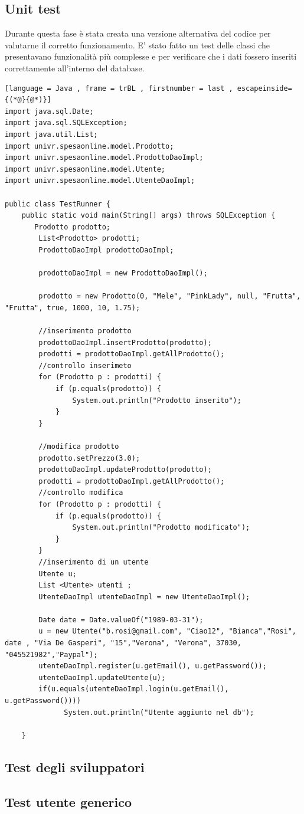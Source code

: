 \documentclass{article}
\begin{document}
\newpage

\subsection{Unit test}
Durante questa fase è stata creata una versione alternativa del codice per valutarne il corretto funzionamento. E' stato fatto un test delle classi che presentavano funzionalità più complesse  e per verificare che i dati fossero inseriti correttamente all'interno del database.

\begin{lstlisting}[language = Java , frame = trBL , firstnumber = last , escapeinside={(*@}{@*)}]
import java.sql.Date;
import java.sql.SQLException;
import java.util.List;
import univr.spesaonline.model.Prodotto;
import univr.spesaonline.model.ProdottoDaoImpl;
import univr.spesaonline.model.Utente;
import univr.spesaonline.model.UtenteDaoImpl;

public class TestRunner {
    public static void main(String[] args) throws SQLException {
       Prodotto prodotto;
        List<Prodotto> prodotti;
        ProdottoDaoImpl prodottoDaoImpl;

        prodottoDaoImpl = new ProdottoDaoImpl();

        prodotto = new Prodotto(0, "Mele", "PinkLady", null, "Frutta", "Frutta", true, 1000, 10, 1.75);

        //inserimento prodotto 
        prodottoDaoImpl.insertProdotto(prodotto);
        prodotti = prodottoDaoImpl.getAllProdotto();
        //controllo inserimeto
        for (Prodotto p : prodotti) {
            if (p.equals(prodotto)) {
                System.out.println("Prodotto inserito");
            }
        }

        //modifica prodotto
        prodotto.setPrezzo(3.0);
        prodottoDaoImpl.updateProdotto(prodotto);
        prodotti = prodottoDaoImpl.getAllProdotto();
        //controllo modifica
        for (Prodotto p : prodotti) {
            if (p.equals(prodotto)) {
                System.out.println("Prodotto modificato");
            }
        }
        //inserimento di un utente
        Utente u;
        List <Utente> utenti ;
        UtenteDaoImpl utenteDaoImpl = new UtenteDaoImpl();
       
        Date date = Date.valueOf("1989-03-31");
        u = new Utente("b.rosi@gmail.com", "Ciao12", "Bianca","Rosi", date , "Via De Gasperi", "15","Verona", "Verona", 37030, "045521982","Paypal");
        utenteDaoImpl.register(u.getEmail(), u.getPassword());
        utenteDaoImpl.updateUtente(u);
        if(u.equals(utenteDaoImpl.login(u.getEmail(), u.getPassword())))
              System.out.println("Utente aggiunto nel db");
        
    }
\end{lstlisting}

\subsection{Test degli sviluppatori}
\subsection{Test utente generico}
\end{document}
